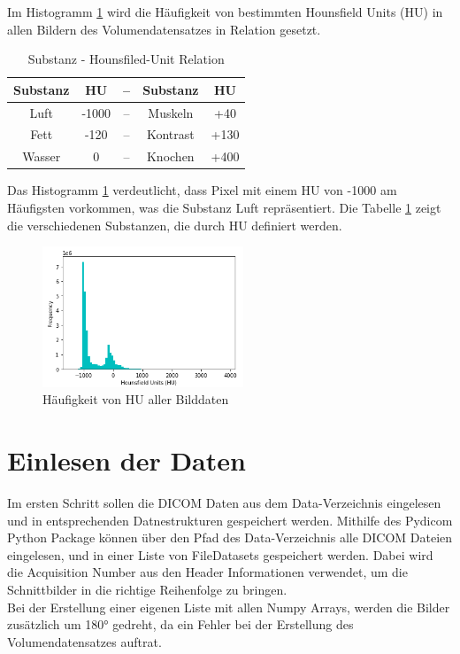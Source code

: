 \documentclass[conference]{IEEEtran}
\begin{document}
Im Histogramm \ref{slice_hist} wird die Häufigkeit von bestimmten Hounsfield Units (HU) in allen Bildern des Volumendatensatzes in Relation gesetzt. \\

\begin{table}[ht]
\caption{Substanz - Hounsfiled-Unit Relation}
\centering
\begin{tabular}{|c|c|c|c|c|}
    \hline
	\textbf{Substanz} & \textbf{HU} & \textbf{--} & \textbf{Substanz} & \textbf{HU}\\
	\hline
	Luft & -1000 & -- & Muskeln & +40\\
	\hline
	Fett & -120 & -- & Kontrast & +130\\
	\hline
	Wasser & 0 & -- & Knochen & +400\\
	\hline
\end{tabular}
\label{HU_table}
\end{table}

Das Histogramm \ref{slice_hist} verdeutlicht, dass Pixel mit einem HU von -1000 am Häufigsten vorkommen, was die Substanz Luft repräsentiert. Die Tabelle \ref{HU_table} zeigt die verschiedenen Substanzen, die durch HU definiert werden.

\begin{figure}[H]
	\begin{center}
		\includegraphics[width=6cm]{latex/images/slices_hist.png}
	 	\caption{Häufigkeit von HU aller Bilddaten}
	 	\label{slice_hist}
	\end{center}
\end{figure}

\section{Einlesen der Daten}
Im ersten Schritt sollen die DICOM Daten aus dem Data-Verzeichnis eingelesen und in entsprechenden Datnestrukturen gespeichert werden.
Mithilfe des Pydicom Python Package\cite{pydicom} können über den Pfad des Data-Verzeichnis alle DICOM Dateien eingelesen, und in einer Liste von FileDatasets gespeichert werden. Dabei wird die Acquisition Number aus den Header Informationen verwendet, um die Schnittbilder in die richtige Reihenfolge zu bringen. \\
Bei der Erstellung einer eigenen Liste mit allen Numpy Arrays, werden die Bilder zusätzlich um 180° gedreht, da ein Fehler bei der Erstellung des Volumendatensatzes auftrat.
\end{document}
